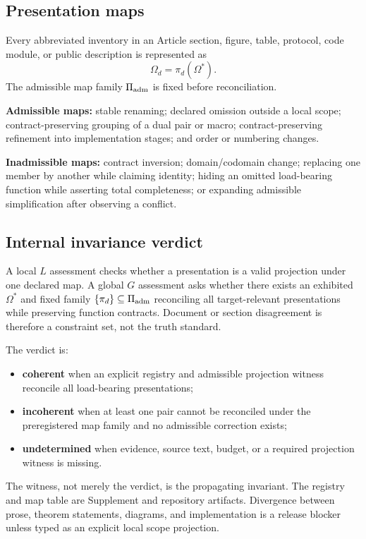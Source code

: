 \documentclass[11pt]{article}
\newcommand{\InvReg}{\Omega^{\ast}}
\begin{document}
\subsection{Presentation maps}

Every abbreviated inventory in an Article section, figure, table, protocol, code module, or public description is represented as
\begin{equation}
\Omega_d=\pi_d(\InvReg).
\end{equation}
The admissible map family $\Pi_{\rm adm}$ is fixed before reconciliation.

\textbf{Admissible maps:} stable renaming; declared omission outside a local scope; contract-preserving grouping of a dual pair or macro; contract-preserving refinement into implementation stages; and order or numbering changes.

\textbf{Inadmissible maps:} contract inversion; domain/codomain change; replacing one member by another while claiming identity; hiding an omitted load-bearing function while asserting total completeness; or expanding admissible simplification after observing a conflict.

\subsection{Internal invariance verdict}

A local $L$ assessment checks whether a presentation is a valid projection under one declared map. A global $G$ assessment asks whether there exists an exhibited $\InvReg$ and fixed family $\{\pi_d\}\subseteq\Pi_{\rm adm}$ reconciling all target-relevant presentations while preserving function contracts. Document or section disagreement is therefore a constraint set, not the truth standard.

The verdict is:
\begin{itemize}
\item \textbf{coherent} when an explicit registry and admissible projection witness reconcile all load-bearing presentations;
\item \textbf{incoherent} when at least one pair cannot be reconciled under the preregistered map family and no admissible correction exists;
\item \textbf{undetermined} when evidence, source text, budget, or a required projection witness is missing.
\end{itemize}
The witness, not merely the verdict, is the propagating invariant. The registry and map table are Supplement and repository artifacts. Divergence between prose, theorem statements, diagrams, and implementation is a release blocker unless typed as an explicit local scope projection.
\end{document}
